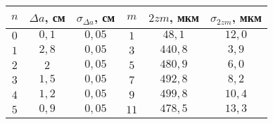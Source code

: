 \begin{tabular}{| c | c | c | c | c | c |}
\hline
$n$ & $\Delta a$, см & $\sigma_{\Delta a}$, см & $m$ & $2 z m$, мкм & $\sigma_{2 z m}$, мкм\\
\hline
$0$ & $0,1$ & $0,05$ & $1$ & $48,1$ & $12,0$\\
\hline
$1$ & $2,8$ & $0,05$ & $3$ & $440,8$ & $3,9$\\
\hline
$2$ & $2$ & $0,05$ & $5$ & $480,9$ & $6,0$\\
\hline
$3$ & $1,5$ & $0,05$ & $7$ & $492,8$ & $8,2$\\
\hline
$4$ & $1,2$ & $0,05$ & $9$ & $499,8$ & $10,4$\\
\hline
$5$ & $0,9$ & $0,05$ & $11$ & $478,5$ & $13,3$\\
\hline
\end{tabular}
